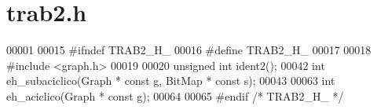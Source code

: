 \section{trab2.\+h}
\label{trab2_8h_source}

\begin{DoxyCode}
00001 
00015 \textcolor{preprocessor}{#ifndef TRAB2\_H\_}
00016 \textcolor{preprocessor}{#define TRAB2\_H\_}
00017 
00018 \textcolor{preprocessor}{#include <graph.h>}
00019 
00020 \textcolor{keywordtype}{unsigned} \textcolor{keywordtype}{int} ident2();
00042 \textcolor{keywordtype}{int} eh_subaciclico(Graph * \textcolor{keyword}{const} g, BitMap * \textcolor{keyword}{const} s);
00043 
00063 \textcolor{keywordtype}{int} eh_aciclico(Graph * \textcolor{keyword}{const} g);
00064 
00065 \textcolor{preprocessor}{#endif }\textcolor{comment}{/* TRAB2\_H\_ */}\textcolor{preprocessor}{}
\end{DoxyCode}
